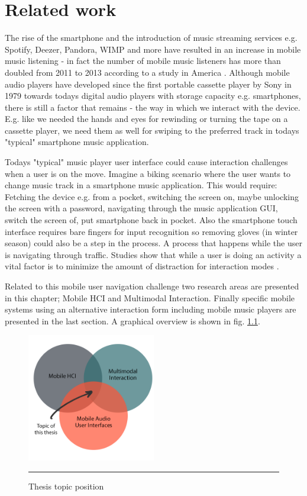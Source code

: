 \chapter{Related work}
The rise of the smartphone and the introduction of music streaming services e.g. Spotify, Deezer, Pandora, WIMP and more have resulted in an increase in mobile music listening - in fact the number of mobile music listeners has more than doubled from 2011 to 2013 according to a study in America \cite{emarketer_music_2014}. Although mobile audio players have developed since the first portable cassette player by Sony in 1979 towards todays digital audio players with storage capacity e.g. smartphones, there is still a factor that remains - the way in which we interact with the device. E.g. like we needed the hands and eyes for rewinding or turning the tape on a cassette player, we need them as well for swiping to the preferred track in todays "typical" smartphone music application.

Todays "typical" music player user interface could cause interaction challenges when a user is on the move. Imagine a biking scenario where the user wants to change music track in a smartphone music application. This would require: Fetching the device e.g. from a pocket, switching the screen on, maybe unlocking the screen with a password, navigating through the music application GUI, switch the screen of, put smartphone back in pocket. Also the smartphone touch interface requires bare fingers for input recognition so removing gloves (in winter season) could also be a step in the process. A process that happens while the user is navigating through traffic. Studies show that while a user is doing an activity a vital factor is to minimize the amount of distraction for interaction modes \cite{pascoe_using_2000}.

Related to this mobile user navigation challenge two research areas are presented in this chapter; Mobile HCI and Multimodal Interaction. Finally specific mobile systems using an alternative interaction form including mobile music players are presented in the last section. A graphical overview is shown in fig. \ref{fig:venn}.

\begin{figure}[htbp]
	\centering
		\includegraphics[width=0.5\textwidth,height=\textheight,keepaspectratio]{./Figures/venn.png}
		\rule{35em}{0.5pt}
	\caption[Venn diagram]{Thesis topic position}
	\label{fig:venn}
\end{figure}


